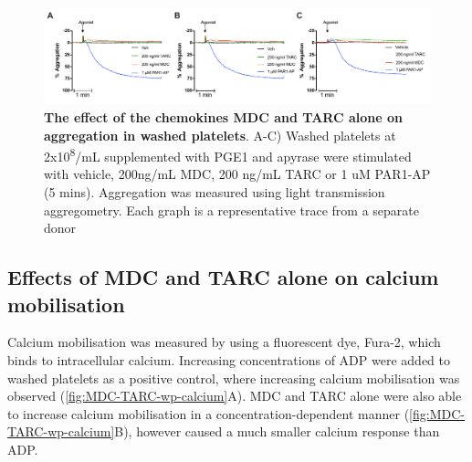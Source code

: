 \documentclass[11pt,twoside]{bristolthesis}
\begin{document}
\begin{figure}
\includegraphics[width=0.9\linewidth]{figure/Chemokines/Layouts/MDC_TARC_alone_wp_aggregation} \caption[The effect of the chemokines MDC and TARC alone on aggregation in washed platelets]{\textbf{The effect of the chemokines MDC and TARC alone on aggregation in washed platelets}. A-C) Washed platelets at 2x10\textsuperscript{8}/mL supplemented with PGE1 and apyrase were stimulated with vehicle, 200ng/mL MDC, 200 ng/mL TARC or 1 uM PAR1-AP (5 mins). Aggregation was measured using light transmission aggregometry. Each graph is a representative trace from a separate donor}\label{fig:MDC-TARC-wp-alone-aggregation}
\end{figure}
\hypertarget{effects-of-mdc-and-tarc-alone-on-calcium-mobilisation}{%
\subsection{Effects of MDC and TARC alone on calcium mobilisation}\label{effects-of-mdc-and-tarc-alone-on-calcium-mobilisation}}

Calcium mobilisation was measured by using a fluorescent dye, Fura-2, which binds to intracellular calcium. Increasing concentrations of ADP were added to washed platelets as a positive control, where increasing calcium mobilisation was observed (\ref{fig:MDC-TARC-wp-calcium}A). MDC and TARC alone were also able to increase calcium mobilisation in a concentration-dependent manner (\ref{fig:MDC-TARC-wp-calcium}B), however caused a much smaller calcium response than ADP.
\end{document}
